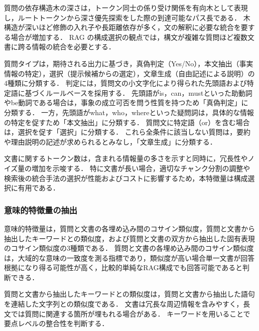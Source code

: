質問の依存構造木の深さは，トークン同士の係り受け関係を有向木として表現し，ルートトークンから深さ優先探索をした際の到達可能なパス長である．
木構造が深いほど修飾の入れ子や長距離依存が多く，文の解釈に必要な統合を要する場合が増加する．
RAG の構成選択の観点では，構文が複雑な質問ほど複数文書に跨る情報の統合を必要とする．

質問タイプは，期待される出力に基づき，真偽判定（Yes/No），本文抽出（事実情報の特定），選択（提示候補からの選定），文章生成（自由記述による説明）の4種類に分類する．
判定には，質問文の小文字化により得られた先頭語および特定語に基づくルールベースを採用する．
先頭語がis，can，mustといった助動詞やbe動詞である場合は，事象の成立可否を問う性質を持つため「真偽判定」に分類する．
一方，先頭語がwhat，who，whereといった疑問詞は，具体的な情報の特定を促すため「本文抽出」に分類する．
質問文に特定語（or）を含む場合は，選択を促す「選択」に分類する．
これら全条件に該当しない質問は，要約や理由説明の記述が求められるとみなし，「文章生成」に分類する．

文書に関するトークン数は，含まれる情報量の多さを示すと同時に，冗長性やノイズ量の増加を示唆する．
特に文書が長い場合，適切なチャンク分割の調整や検索後の統合手法の選択が性能およびコストに影響するため，本特徴量は構成選択に有用である．

\subsubsection{意味的特徴量の抽出}
意味的特徴量は，質問と文書の各埋め込み間のコサイン類似度，質問と文書から抽出したキーワードとの類似度，および質問と文書の双方から抽出した固有表現のコサイン類似度の3種類である．
質問と文書の各埋め込み間のコサイン類似度は，大域的な意味の一致度を測る指標であり，類似度が高い場合単一文書が回答根拠になり得る可能性が高く，比較的単純なRAG構成でも回答可能であると判断できる．

質問と文書から抽出したキーワードとの類似度は，質問と文書から抽出した語句を連結した文字列との類似度である．
文書は冗長な周辺情報を含みやすく，長文では質問に関連する箇所が埋もれる場合がある．
キーワードを用いることで要点レベルの整合性を判断する．

